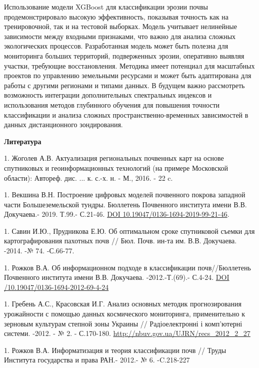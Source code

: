 Использование модели XGBoost для классификации эрозии почвы
продемонстрировало высокую эффективность, показывая точность как на
тренировочной, так и на тестовой выборках. Модель учитывает нелинейные
зависимости между входными признаками, что важно для анализа сложных
экологических процессов. Разработанная модель может быть полезна для
мониторинга больших территорий, подверженных эрозии, оперативно выявляя
участки, требующие восстановления. Методика имеет потенциал для
масштабных проектов по управлению земельными ресурсами и может быть
адаптирована для работы с другими регионами и типами данных. В будущем
важно рассмотреть возможность интеграции дополнительных спектральных
индексов и использования методов глубинного обучения для повышения
точности классификации и анализа сложных пространственно-временных
зависимостей в данных дистанционного зондирования.

{\bfseries Литература}


1. Жоголев А.В. Актуализация региональных почвенных карт на основе
спутниковых и геоинформационных технологий (на примере Московской
области): Автореф. дис. ... к. с.-х. н. - М., 2016. - 22 c.

1. Векшина В.Н. Построение цифровых моделей почвенного покрова западной
части Большеземельской тундры. Бюллетень Почвенного института имени
В.В. Докучаева.- 2019. Т.99.- С.21-46.
\href{https://doi.org/10.19047/0136-1694-2019-99-21-46}{DOI
10.19047/0136-1694-2019-99-21-46}.

1. Савин И.Ю., Прудникова Е.Ю. Об оптимальном сроке спутниковой съемки
для картографирования пахотных почв // Бюл. Почв. ин-та им. В.В.
Докучаева. -2014. -№ 74. -С.66-77.

1. Рожков В.А. Об информационном подходе в классификации почв//Бюллетень
Почвенного института имени В.В. Докучаева. -2012.-Т.(69).- С.4-24.
\href{https://doi.org/10.19047/0136-1694-2012-69-4-24}{DOI
/10.19047/0136-1694-2012-69-4-24}

1. Гребень А.С., Красовская И.Г. Анализ основных методик прогнозирования
урожайности с помощью данных космического мониторинга, применительно к
зерновым культурам степной зоны Украины // Радіоелектронні і
комп'ютерні системи. -2012. - № 2. - С.170-180.
\href{http://www.irbis-nbuv.gov.ua/cgi-bin/irbis_nbuv/cgiirbis_64.exe?I21DBN=LINK&P21DBN=UJRN&Z21ID=&S21REF=10&S21CNR=20&S21STN=1&S21FMT=ASP_meta&C21COM=S&2_S21P03=FILA=&2_S21STR=recs_2012_2_27}{http://nbuv.gov.ua/UJRN/recs\_2012\_2\_27}

1. Рожков В.А. Информатизация и теория классификации почв // Труды
Института государства и права РАН.- 2012.- № 6. -C.218-227


